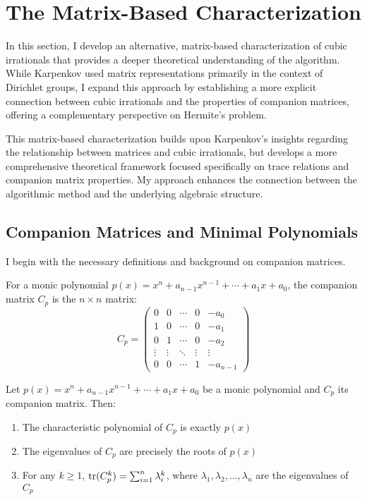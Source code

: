 \section{The Matrix-Based Characterization}\label{sec:matrix_approach}

In this section, I develop an alternative, matrix-based characterization of cubic irrationals that provides a deeper theoretical understanding of the \HAPD{} algorithm. While Karpenkov \cite{Karpenkov2022} used matrix representations primarily in the context of Dirichlet groups, I expand this approach by establishing a more explicit connection between cubic irrationals and the properties of companion matrices, offering a complementary perspective on Hermite's problem.

This matrix-based characterization builds upon Karpenkov's insights regarding the relationship between matrices and cubic irrationals, but develops a more comprehensive theoretical framework focused specifically on trace relations and companion matrix properties. My approach enhances the connection between the algorithmic method and the underlying algebraic structure.

\subsection{Companion Matrices and Minimal Polynomials}

I begin with the necessary definitions and background on companion matrices.

\begin{definition}
For a monic polynomial $p(x) = x^n + a_{n-1}x^{n-1} + \cdots + a_1x + a_0$, the companion matrix $C_p$ is the $n \times n$ matrix:
\begin{equation}
C_p = \begin{pmatrix}
0 & 0 & \cdots & 0 & -a_0 \\
1 & 0 & \cdots & 0 & -a_1 \\
0 & 1 & \cdots & 0 & -a_2 \\
\vdots & \vdots & \ddots & \vdots & \vdots \\
0 & 0 & \cdots & 1 & -a_{n-1}
\end{pmatrix}
\end{equation}
\end{definition}

\begin{proposition}\label{prop:companion_properties}
Let $p(x) = x^n + a_{n-1}x^{n-1} + \cdots + a_1x + a_0$ be a monic polynomial and $C_p$ its companion matrix. Then:
\begin{enumerate}
    \item The characteristic polynomial of $C_p$ is exactly $p(x)$
    \item The eigenvalues of $C_p$ are precisely the roots of $p(x)$
    \item For any $k \geq 1$, $\operatorname{tr}(C_p^k) = \sum_{i=1}^{n} \lambda_i^k$, where $\lambda_1, \lambda_2, \ldots, \lambda_n$ are the eigenvalues of $C_p$
\end{enumerate}
\end{proposition}

